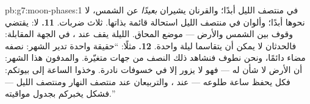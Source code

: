 \begin{solution}{pb:g7:moon-phases:1}
في منتصف الليل أبدًا؛ والقرنان يشيران \emph{بعيدًا} عن الشمس،
لا نحوها أبدًا؛ وألوان  في منتصف الليل استحالة قائمة
بذاتها. ثلاث ضربات.
\textbf{11.} لا:  يقتضي وقوف  بين الشمس والأرض ---
موضع المحاق.  الليلة يقف عند ، في الجهة المقابلة:
فالحدثان لا يمكن أن يتقاسما ليلة واحدة.
\textbf{12.} مثلًا: ``حقيقة واحدة تدير الشهر:  نصفه مضاء
دائمًا، ونحن نطوف فنشاهد ذلك النصف من جهات متغيّرة. والمدفون
هذا الشهر: أن  الأرض لا شأن له  --- فهو لا يزور إلا
في خسوفات نادرة. وخذوا الساعة إلى بيوتكم: فكل  يحفظ ساعة
طلوعه ---  عند ، والتربيعان عند منتصف النهار ومنتصف
الليل --- فشكل  يخبركم بجدول مواقيته.''
\end{solution}
